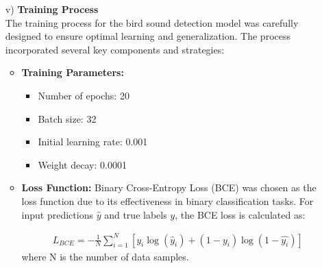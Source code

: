 \begin{itemize}
      
            \item[v)] \textbf{Training Process} \\
            The training process for the bird sound detection model was carefully designed to ensure optimal learning and generalization. The process incorporated several key components and strategies:
            \begin{itemize}
                  \\
                  \item \textbf{Training Parameters:}
                  \begin{itemize}
                        \item Number of epochs: 20
                        \item Batch size: 32
                        \item Initial learning rate: 0.001
                        \item Weight decay: 0.0001
                  \end{itemize}

                  \item \textbf{Loss Function:}
                  Binary Cross-Entropy Loss (BCE) was chosen as the loss function due to its effectiveness in binary classification tasks. For input predictions $\hat{y}$ and true labels $y$, the BCE loss is calculated as:
                  
                  
                  \begin{eqnarray}
                        L_{BCE} = -\frac{1}{N}\sum_{i=1}^{N}[y_i\log(\hat{y}_i) + (1-y_i)\log(1-\hat{y_i})]
                  \end{eqnarray}
                        where N is the number of data samples.


\end{itemize}
\end{itemize}
